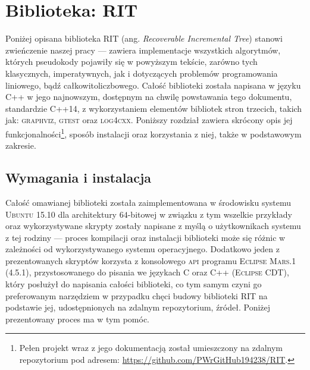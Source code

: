 \chapter{Biblioteka:  RIT}
\label{app:takeMeHome}
\thispagestyle{appendixStyle}

Poniżej opisana biblioteka \textsc{RIT} (ang. \textit{Recoverable Incremental Tree}) stanowi zwieńczenie naszej pracy --- zawiera implementacje wszystkich algorytmów, których pseudokody pojawiły się w powyższym tekście, zarówno tych klasycznych, imperatywnych, jak i dotyczących problemów programowania liniowego, bądź całkowitoliczbowego. Całość biblioteki została napisana w języku \textsc{C++} w jego najnowszym, dostępnym na chwilę powstawania tego dokumentu, standardzie \textsc{C++14}, z wykorzystaniem elementów bibliotek stron trzecich, takich jak: \textsc{graphviz}, \textsc{gtest} oraz \textsc{log4cxx}. Poniższy rozdział zawiera skrócony opis jej funkcjonalności\footnote{Pełen projekt wraz z jego dokumentacją został umieszczony na zdalnym repozytorium pod adresem: \url{https://github.com/PWrGitHub194238/RIT}.}, sposób instalacji oraz korzystania z niej, także w podstawowym zakresie.

\section{Wymagania i instalacja}

Całość omawianej biblioteki została zaimplementowana w środowisku systemu \textsc{Ubuntu 15.10} dla architektury $64$-bitowej w związku z tym wszelkie przykłady oraz wykorzystywane skrypty zostały napisane z myślą o użytkownikach systemu z tej rodziny --- proces kompilacji oraz instalacji biblioteki może się różnic w zależności od wykorzystywanego systemu operacyjnego. Dodatkowo jeden z prezentowanych skryptów korzysta z konsolowego \textsc{api} programu \textsc{Eclipse Mars.1 (4.5.1)}, przystosowanego do pisania we językach \textsc{C} oraz \textsc{C++} (\textsc{Eclipse CDT}), który posłużył do napisania całości biblioteki, co tym samym czyni go preferowanym narzędziem w przypadku chęci budowy biblioteki \textsc{RIT} na podstawie jej, udostępnionych na zdalnym repozytorium, źródeł. Poniżej prezentowany proces ma w tym pomóc.





